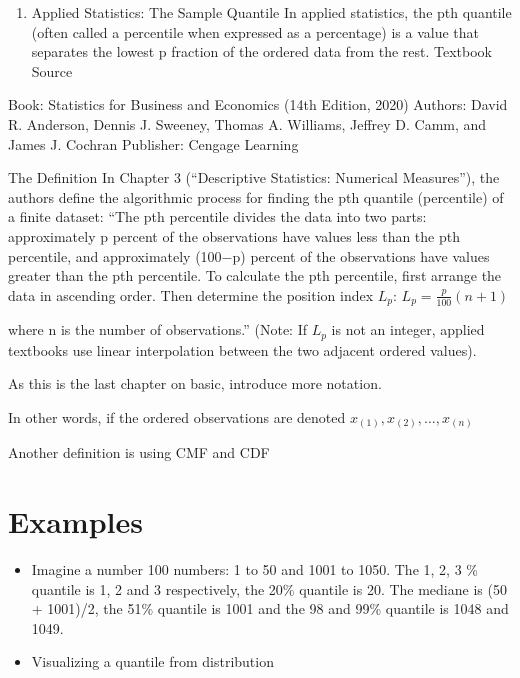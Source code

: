 \documentclass[
  letterpaper,
  DIV=11,
  numbers=noendperiod]{scrreprt}
\providecommand{\tightlist}{%
  \setlength{\itemsep}{0pt}\setlength{\parskip}{0pt}}
\begin{document}
\begin{enumerate}
\def\labelenumi{\arabic{enumi}.}
\tightlist
\item
  Applied Statistics: The Sample Quantile In applied statistics, the pth
  quantile (often called a percentile when expressed as a percentage) is
  a value that separates the lowest p fraction of the ordered data from
  the rest. Textbook Source
\end{enumerate}

Book: Statistics for Business and Economics (14th Edition, 2020)
Authors: David R. Anderson, Dennis J. Sweeney, Thomas A. Williams,
Jeffrey D. Camm, and James J. Cochran Publisher: Cengage Learning

The Definition In Chapter 3 (``Descriptive Statistics: Numerical
Measures''), the authors define the algorithmic process for finding the
pth quantile (percentile) of a finite dataset: ``The pth percentile
divides the data into two parts: approximately p percent of the
observations have values less than the pth percentile, and approximately
(100−p) percent of the observations have values greater than the pth
percentile. To calculate the pth percentile, first arrange the data in
ascending order. Then determine the position index \(L_p\):
\(L_p = \frac{p}{100}(n + 1)\)

where n is the number of observations.'' (Note: If \(L_p\) is not an
integer, applied textbooks use linear interpolation between the two
adjacent ordered values).

As this is the last chapter on basic, introduce more notation.

In other words, if the ordered observations are denoted
\(x_{(1)},x_{(2)}, \ldots, x_{(n)}\) \hspace{0pt}

Another definition is using CMF and CDF

\section*{Examples}\label{examples-23}


\begin{itemize}
\item
  Imagine a number 100 numbers: 1 to 50 and 1001 to 1050. The 1, 2, 3 \%
  quantile is 1, 2 and 3 respectively, the 20\% quantile is 20. The
  mediane is (50 + 1001)/2, the 51\% quantile is 1001 and the 98 and
  99\% quantile is 1048 and 1049.
\item
  Visualizing a quantile from distribution
\end{itemize}
\end{document}
